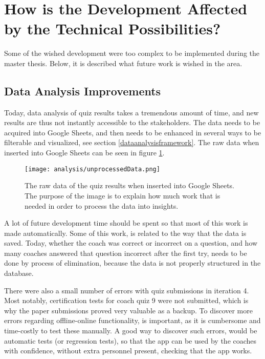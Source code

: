 \section{How is the Development Affected by the Technical Possibilities?}\label{rq1}

Some of the wished development were too complex to be implemented during the master thesis. Below, it is described what future work is wished in the area.

\subsection{Data Analysis Improvements}
Today, data analysis of quiz results takes a tremendous amount of time, and new results are thus not instantly accessible to the stakeholders. The data needs to be acquired into Google Sheets, and then needs to be enhanced in several ways to be filterable and visualized, see section \ref{dataanalysisframework}. The raw data when inserted into Google Sheets can be seen in figure \ref{fig:unprocessedData}.

\begin{figure}[h]
  \centering
  \texttt{[image: analysis/unprocessedData.png]}
  \caption{The raw data of the quiz results when inserted into Google Sheets. The purpose of the image is to explain how much work that is needed in order to process the data into insights.}
  \label{fig:unprocessedData}
\end{figure}

A lot of future development time should be spent so that most of this work is made automatically. Some of this work, is related to the way that the data is saved. Today, whether the coach was correct or incorrect on a question, and how many coaches answered that question incorrect after the first try, needs to be done by process of elimination, because the data is not properly structured in the database.

There were also a small number of errors with quiz submissions in iteration 4. Most notably, certification tests for coach quiz 9 were not submitted, which is why the paper submissions proved very valuable as a backup. To discover more errors regarding offline-online functionality, is important, as it is cumbersome and time-costly to test these manually. A good way to discover such errors, would be automatic tests (or regression tests), so that the app can be used by the coaches with confidence, without extra personnel present, checking that the app works.

